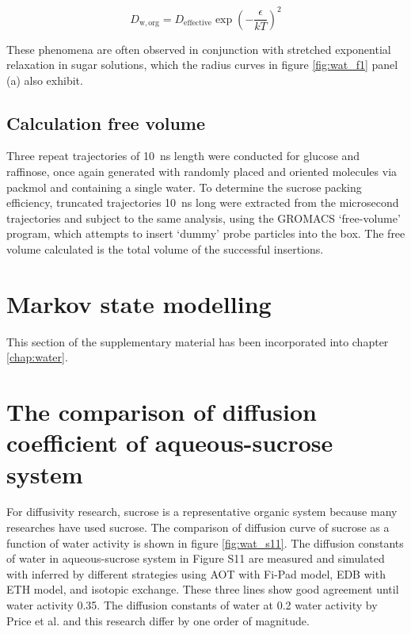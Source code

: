 \begin{equation}
D_{\mathrm{w, org}}=D_{\mathrm{effective}} \exp \left(-\frac{\epsilon}{k T}\right)^{2}
\end{equation}

These  phenomena  are  often  observed  in  conjunction  with stretched  exponential  relaxation  in  sugar solutions,\cite{mesteGlassTransitionFood2002}\cite{Liu2006} which the radius curves in figure \ref{fig:wat_f1} panel (a) also exhibit. 

\subsection{Calculation free volume}
Three repeat trajectories of \SI{10}{\nano\second} length were conducted for glucose and raffinose, once again generated with randomly placed and oriented molecules via packmol and containing a single water. To determine the sucrose packing efficiency, truncated trajectories \SI{10}{\nano\second} long were extracted from the microsecond trajectories and subject to the same analysis, using the GROMACS `free-volume’ program, which attempts to insert `dummy’ probe particles into the box. The free volume calculated is the total volume of the successful insertions.

\section{Markov state modelling}

This section of the supplementary material has been incorporated into chapter \ref{chap:water}. 

\section{The comparison of diffusion coefficient of aqueous-sucrose system}

For diffusivity research, sucrose is a representative organic system because many researches have used sucrose. The comparison of diffusion curve of sucrose as a function of water activity is shown in figure \ref{fig:wat_s11}. The diffusion constants of water in aqueous-sucrose system in Figure S11 are measured and simulated with inferred by different strategies using AOT with Fi-Pad model, EDB with ETH model, and isotopic exchange. These three lines show good agreement until water activity \num{0.35}. The diffusion constants of water at \num{0.2} water activity by Price et al.\cite{Price2014} and this research differ by one order of magnitude. 

